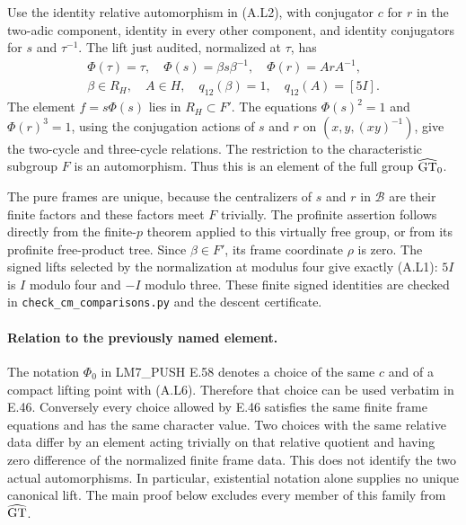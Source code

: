 Use the identity relative automorphism in (A.L2), with conjugator $c$ for $r$ in the two-adic component, identity in every other component, and identity conjugators for $s$ and $\tau^{-1}$. The lift just audited, normalized at $\tau$, has
\[
 \begin{gathered}
 \Phi(\tau)=\tau,\quad
 \Phi(s)=\beta s\beta^{-1},\quad
 \Phi(r)=ArA^{-1},\\
 \beta\in R_H,\quad A\in H,\quad
 q_{12}(\beta)=1,\quad q_{12}(A)=[5I].
 \end{gathered}
 \tag{A.L6}
\]
The element $f=s\Phi(s)$ lies in $R_H\subset F'$. The equations $\Phi(s)^2=1$ and $\Phi(r)^3=1$, using the conjugation actions of $s$ and $r$ on $(x,y,(xy)^{-1})$, give the two-cycle and three-cycle relations. The restriction to the characteristic subgroup $F$ is an automorphism. Thus this is an element of the full group $\widehat{\mathrm{GT}}_0$.

The pure frames are unique, because the centralizers of $s$ and $r$ in $\mathcal B$ are their finite factors and these factors meet $F$ trivially. The profinite assertion follows directly from the finite-$p$ theorem applied to this virtually free group, or from its profinite free-product tree. Since $\beta\in F'$, its frame coordinate $\rho$ is zero. The signed lifts selected by the normalization at modulus four give exactly (A.L1): $5I$ is $I$ modulo four and $-I$ modulo three. These finite signed identities are checked in \texttt{check\_cm\_comparisons.py} and the descent certificate.

\paragraph{Relation to the previously named element.}
The notation $\Phi_0$ in LM7\_PUSH E.58 denotes a choice of the same $c$ and of a compact lifting point with (A.L6). Therefore that choice can be used verbatim in E.46. Conversely every choice allowed by E.46 satisfies the same finite frame equations and has the same character value. Two choices with the same relative data differ by an element acting trivially on that relative quotient and having zero difference of the normalized finite frame data. This does not identify the two actual automorphisms. In particular, existential notation alone supplies no unique canonical lift. The main proof below excludes every member of this family from $\widehat{\mathrm{GT}}$.
